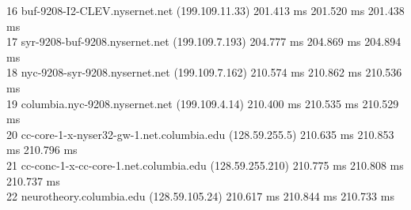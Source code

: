 \documentclass[a4paper,11pt]{article}
\begin{document}
\begin{enumerate}[leftmargin=*]
{		16  buf-9208-I2-CLEV.nysernet.net (199.109.11.33)  201.413 ms  201.520 ms  201.438 ms\\
		17  syr-9208-buf-9208.nysernet.net (199.109.7.193)  204.777 ms  204.869 ms  204.894 ms\\
		18  nyc-9208-syr-9208.nysernet.net (199.109.7.162)  210.574 ms  210.862 ms  210.536 ms\\
		19  columbia.nyc-9208.nysernet.net (199.109.4.14)  210.400 ms  210.535 ms  210.529 ms\\
		20  cc-core-1-x-nyser32-gw-1.net.columbia.edu (128.59.255.5)  210.635 ms  210.853 ms  210.796 ms\\
		21  cc-conc-1-x-cc-core-1.net.columbia.edu (128.59.255.210)  210.775 ms  210.808 ms  210.737 ms\\
	22  neurotheory.columbia.edu (128.59.105.24)  210.617 ms  210.844 ms  210.733 ms\\}


\end{enumerate}
\end{document}
